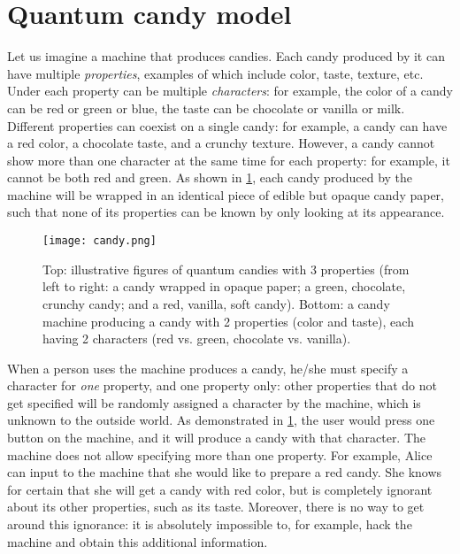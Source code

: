 \documentclass{article}
\begin{document}
\section{Quantum candy model}
Let us imagine a machine that produces candies.
Each candy produced by it can have multiple \textit{properties}, examples of which include color, taste, texture, etc.
Under each property can be multiple \textit{characters}: for example, the color of a candy can be red or green or blue, the taste can be chocolate or vanilla or milk.
Different properties can coexist on a single candy: for example, a candy can have a red color, a chocolate taste, and a crunchy texture.
However, a candy cannot show more than one character at the same time for each property: for example, it cannot be both red and green.
As shown in \cref{candy}, each candy produced by the machine will be wrapped in an identical piece of edible but opaque candy paper, such that none of its properties can be known by only looking at its appearance.

\begin{figure}[ht]
	\centering
	\texttt{[image: candy.png]}
	\caption{Top: illustrative figures of quantum candies with 3 properties (from left to right: a  candy wrapped in opaque paper; a green, chocolate, crunchy candy; and a red, vanilla, soft candy). Bottom: a candy machine producing a candy with 2 properties (color and taste), each having 2 characters (red vs. green, chocolate vs. vanilla).} 
	\label{candy}
\end{figure}

When a person uses the machine produces a candy, he/she must specify a character for \textit{one} property, and one property only: other properties that do not get specified will be randomly assigned a character by the machine, which is unknown to the outside world.
As demonstrated in \cref{candy}, the user would press one button on the machine, and it will produce a candy with that character.
The machine does not allow specifying more than one property.
For example, Alice can input to the machine that she would like to prepare a red candy.
She knows for certain that she will get a candy with red color, but is completely ignorant about its other properties, such as its taste.
Moreover, there is no way to get around this ignorance: it is absolutely impossible to, for example, hack the machine and obtain this additional information.
\end{document}
